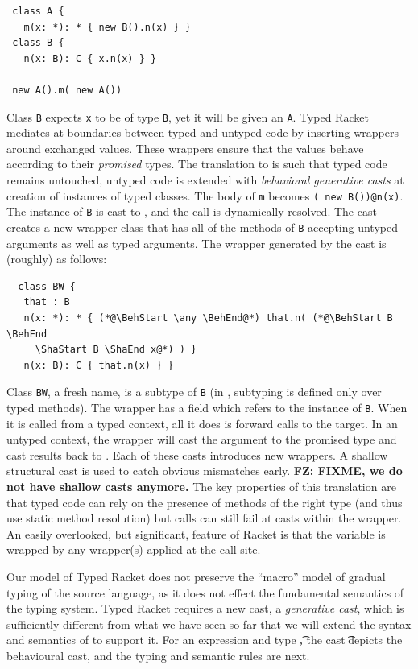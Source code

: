 \documentclass[acmlarge, anonymous, authordraft]{acmart}
\newcommand{\code}[1]{{\tt #1}\xspace}
\newcommand{\FZ}[1]{\textbf{FZ: #1}}
\begin{document}
\begin{lstlisting}
 class A {
   m(x: *): * { new B().n(x) } }
 class B {
   n(x: B): C { x.n(x) } }

 new A().m( new A())
\end{lstlisting}

\noindent Class \code B expects \code x to be of type \code B, yet it will
be given an \code A. Typed Racket mediates at boundaries between typed and
untyped code by inserting wrappers around exchanged values. These wrappers
ensure that the values behave according to their \emph{promised} types. The
translation to \kafka is such that typed code remains untouched, untyped
code is extended with \emph{behavioral generative casts} at creation of
instances of typed classes. The body of \code m becomes {\tt ({\BehStart
    \any \BehEnd}new B())@n(x)}.  The instance of \code B is cast to \any,
and the call is dynamically resolved. The cast creates a new wrapper class
that has all of the methods of \code B accepting untyped arguments as well
as typed arguments. The wrapper generated by the cast is (roughly) as
follows:

\begin{lstlisting}
  class BW {
   that : B
   n(x: *): * { (*@\BehStart \any \BehEnd@*) that.n( (*@\BehStart B \BehEnd
     \ShaStart B \ShaEnd x@*) ) }
   n(x: B): C { that.n(x) } }
\end{lstlisting}

\noindent Class \code{BW}, a fresh name, is a subtype of
\code B (in \kafka, subtyping is defined only over typed methods).  The
wrapper has a field \that which refers to the instance of \code B. When it
is called from a typed context, all it does is forward calls to the
target. In an untyped context, the wrapper will cast the argument to the
promised type and cast results back to \any. Each of these casts introduces
new wrappers. A shallow structural cast is used to catch obvious mismatches
early.   \FZ{FIXME, we do not have shallow casts anymore.}
 The key properties of this translation are that typed code can rely
on the presence of methods of the right type (and thus use static method
resolution) but calls can still fail at casts within the wrapper. An easily
overlooked, but significant, feature of Racket is that the \this variable is
wrapped by any wrapper(s) applied at the call site.


Our model of Typed Racket does not preserve the ``macro'' model of gradual
typing of the source language, as it does not effect the fundamental
semantics of the typing system.  Typed Racket requires a new cast, a
\emph{generative cast}, which is sufficiently different from what we have
seen so far that we will extend the syntax and semantics of \kafka to
support it.  For an expression \e and type \t, the cast \BehCast\t\e depicts
the behavioural cast, and the typing and semantic rules are next.
\end{document}
